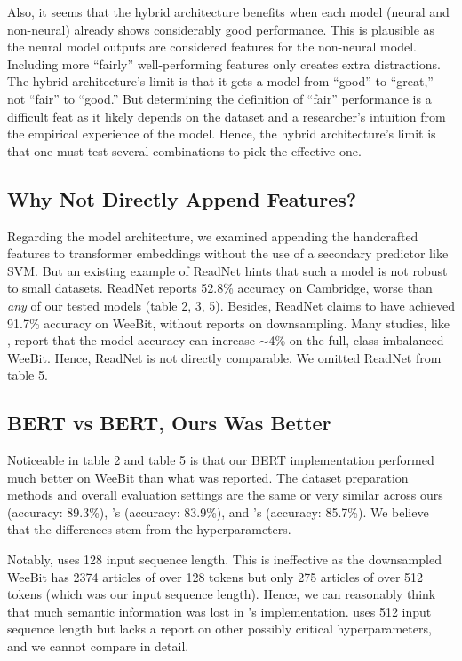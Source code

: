 \documentclass[11pt]{article}
\begin{document}
Also, it seems that the hybrid architecture benefits when each model (neural and non-neural) already shows considerably good performance. This is plausible as the neural model outputs are considered features for the non-neural model. Including more ``fairly'' well-performing features only creates extra distractions. The hybrid architecture's limit is that it gets a model from ``good'' to ``great,'' not ``fair'' to ``good.'' But determining the definition of ``fair'' performance is a difficult feat as it likely depends on the dataset and a researcher's intuition from the empirical experience of the model. Hence, the hybrid architecture's limit is that one must test several combinations to pick the effective one.

\subsection{Why Not Directly Append Features?}
Regarding the model architecture, we examined appending the handcrafted features to transformer embeddings without the use of a secondary predictor like SVM. But an existing example of ReadNet \citep{10.1007/978-3-030-45439-5_3} hints that such a model is not robust to small datasets. ReadNet reports 52.8\% accuracy on Cambridge, worse than \textit{any} of our tested models (table 2, 3, 5). Besides, ReadNet claims to have achieved 91.7\% accuracy on WeeBit, without reports on downsampling. Many studies, like \citet{deutsch-etal-2020-linguistic}, report that the model accuracy can increase $\sim$4\% on the full, class-imbalanced WeeBit. Hence, ReadNet is not directly comparable. We omitted ReadNet from table 5.

\subsection{BERT vs BERT, Ours Was Better}
Noticeable in table 2 and table 5 is that our BERT implementation performed much better on WeeBit than what was reported. The dataset preparation methods and overall evaluation settings are the same or very similar across ours (accuracy: 89.3\%), \citet{deutsch-etal-2020-linguistic}'s (accuracy: 83.9\%), and \citet{Martinc:21}'s (accuracy: 85.7\%). We believe that the differences stem from the hyperparameters. 

Notably, \citet{deutsch-etal-2020-linguistic} uses 128 input sequence length. This is ineffective as the downsampled WeeBit has 2374 articles of over 128 tokens but only 275 articles of over 512 tokens (which was our input sequence length). Hence, we can reasonably think that much semantic information was lost in \citet{deutsch-etal-2020-linguistic}'s implementation. \citet{Martinc:21} uses 512 input sequence length but lacks a report on other possibly critical hyperparameters, and we cannot compare in detail.
\end{document}
